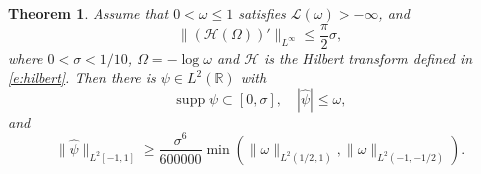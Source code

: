 \documentclass[reqno,12pt,letterpaper]{amsart}
\newtheorem{thm}[prop]{Theorem}
\numberwithin{equation}{section}
\numberwithin{prop}{section}
\DeclareMathOperator{\supp}{supp}
\begin{document}
\begin{thm}
\label{t:effect-multiplier}
Assume that $0<\omega\leq 1$ satisfies $\mathcal{L}(\omega)>-\infty$, and
\begin{equation}
\label{e:hilbert-bd}
\|(\mathcal{H}(\Omega))'\|_{L^\infty}\leq \frac{\pi}{2}\sigma,
\end{equation}
where $0<\sigma<1/10$, $\Omega=-\log\omega$ and $\mathcal{H}$ is the Hilbert transform defined in \eqref{e:hilbert}. Then there is $\psi\in L^2(\mathbb{R})$ with
\begin{equation}
\label{e:psi-supp}
\supp\psi\subset[0,\sigma],
\quad |\widehat{\psi}|\leq\omega,
\end{equation}
and 
\begin{equation}
\label{e:psi-lb}
\|\widehat{\psi}\|_{L^2[-1,1]}\geq \frac{\sigma^6}{600000}\min(\|\omega\|_{L^2(1/2,1)},\|\omega\|_{L^2(-1,-1/2)}).
\end{equation}
\end{thm}

\end{document}
